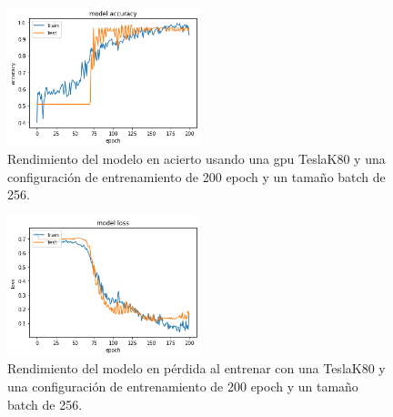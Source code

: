 \begin{figure}
    \centering
    \includegraphics[width=0.5\textwidth]{images/chapter5/batch_256_200_epoch.png}
    \caption{Rendimiento del modelo en acierto usando una gpu TeslaK80 y una configuración de entrenamiento de 200 epoch y un tamaño batch de 256.}
    \label{fig:Resultados de la precisión de entrenamiento con un batch-size de 256 y 200 epochs}
\end{figure}

\begin{figure}
    \centering
    \includegraphics[width=0.5\textwidth]{images/chapter5/batch_256_200_epoch_loss.png}
    \caption{Rendimiento del modelo en pérdida al entrenar con una TeslaK80 y una configuración de entrenamiento de 200 epoch y un tamaño batch de 256.}
    \label{fig:Resultados de loss en el entrenamiento con un batch-size de 256 y 200 epochs}
\end{figure}



